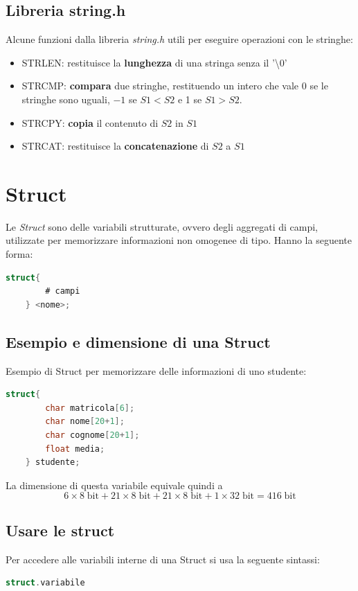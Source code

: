 \documentclass[a4paper,11pt,oneside]{book}
\begin{document}
\section{Libreria string.h}
Alcune funzioni dalla libreria \emph{string.h} utili per eseguire operazioni con le stringhe:
\begin{itemize}
    \item STRLEN: restituisce la \textbf{lunghezza} di una stringa senza il '\textbackslash0'
    \item STRCMP: \textbf{compara} due stringhe, restituendo un intero che vale $0$ se le stringhe sono uguali, $-1$ se $S1<S2$ e 1 se $S1>S2$.
    \item STRCPY: \textbf{copia} il contenuto di $S2$ in $S1$
    \item STRCAT: restituisce la \textbf{concatenazione} di $S2$ a $S1$
\end{itemize}

\chapter{Struct}
Le \emph{Struct} sono delle variabili strutturate, ovvero degli aggregati di campi, utilizzate per 
memorizzare informazioni non omogenee di tipo. Hanno la seguente forma:
\begin{lstlisting}[language=C]
    struct{
        # campi
    } <nome>;
\end{lstlisting}

\section{Esempio e dimensione di una Struct}
Esempio di Struct per memorizzare delle informazioni di uno studente:
\begin{lstlisting}[language=C]
    struct{
        char matricola[6];
        char nome[20+1];
        char cognome[20+1];
        float media;
    } studente;
\end{lstlisting}
La dimensione di questa variabile equivale quindi a
\begin{equation*}
    6 \times 8 \;\text{bit} +
    21 \times 8 \;\text{bit} +
    21 \times 8 \;\text{bit} +
    1 \times 32 \;\text{bit} = 416 \; \text{bit}
\end{equation*}

\section{Usare le struct}
Per accedere alle variabili interne di una Struct si usa la seguente sintassi:
\begin{lstlisting}[language=C]
    struct.variabile
\end{lstlisting}
\end{document}
